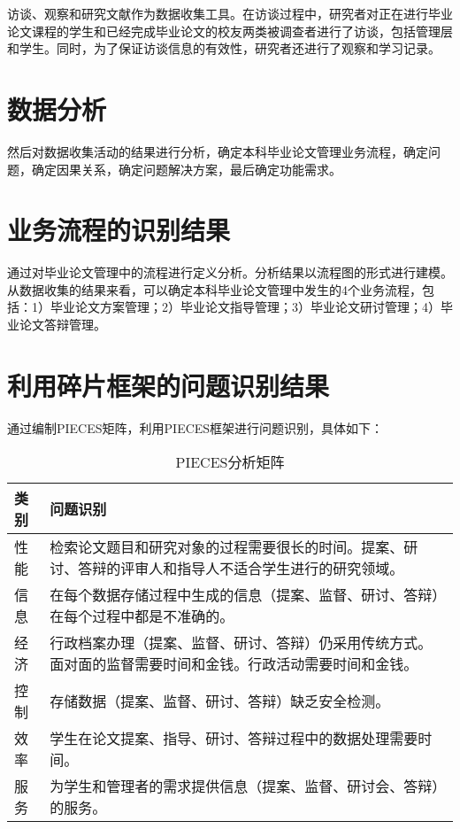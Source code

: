 访谈、观察和研究文献作为数据收集工具。在访谈过程中，研究者对正在进行毕业论文课程的学生和已经完成毕业论文的校友两类被调查者进行了访谈，包括管理层和学生。同时，为了保证访谈信息的有效性，研究者还进行了观察和学习记录。

\section{数据分析}

然后对数据收集活动的结果进行分析，确定本科毕业论文管理业务流程，确定问题，确定因果关系，确定问题解决方案，最后确定功能需求。

\section{业务流程的识别结果}

通过对毕业论文管理中的流程进行定义分析。分析结果以流程图的形式进行建模。从数据收集的结果来看，可以确定本科毕业论文管理中发生的4个业务流程，包括：1）毕业论文方案管理；2）毕业论文指导管理；3）毕业论文研讨管理；4）毕业论文答辩管理。

\section{利用碎片框架的问题识别结果}

通过编制PIECES矩阵，利用PIECES框架进行问题识别，具体如下：

\begin{table}[htbp]
      \centering
      \song\wuhao
      \caption{PIECES分析矩阵}
      \label{PIECES分析矩阵}
      \begin{tabular}{lp{13cm}}
            \hline
            类别 & 问题识别                                                                                                   \\ \hline
            性能 & 检索论文题目和研究对象的过程需要很长的时间。提案、研讨、答辩的评审人和指导人不适合学生进行的研究领域。     \\
            信息 & 在每个数据存储过程中生成的信息（提案、监督、研讨、答辩）在每个过程中都是不准确的。                         \\
            经济 & 行政档案办理（提案、监督、研讨、答辩）仍采用传统方式。面对面的监督需要时间和金钱。行政活动需要时间和金钱。 \\
            控制 & 存储数据（提案、监督、研讨、答辩）缺乏安全检测。                                                           \\
            效率 & 学生在论文提案、指导、研讨、答辩过程中的数据处理需要时间。                                                 \\
            服务 & 为学生和管理者的需求提供信息（提案、监督、研讨会、答辩）的服务。                                           \\ \hline
      \end{tabular}
\end{table}

